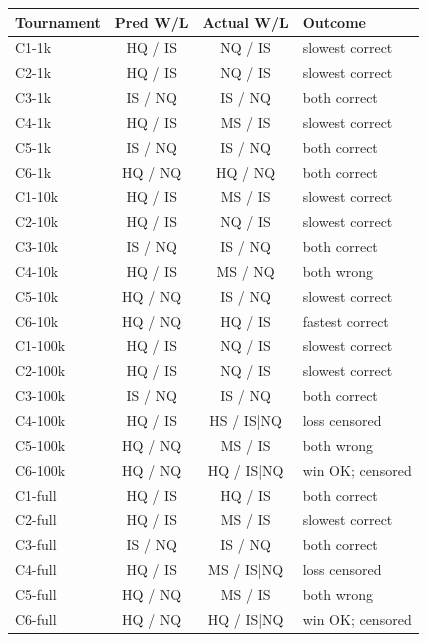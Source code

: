 \documentclass[10pt,a4paper]{article}
\begin{document}
\begin{minipage}[t]{0.485\linewidth}\vspace{0pt}
{\fontsize{8.6}{10.4}\selectfont
\renewcommand{\arraystretch}{1.28}
\begin{tabularx}{\linewidth}{@{}L{1.05}C{0.8}C{0.85}L{1.3}@{}}
\toprule{}
\textbf{Tournament} & \textbf{Pred W/L} & \textbf{Actual W/L} & \textbf{Outcome} \\
\midrule
C1-1k & HQ / IS & NQ / IS & slowest correct \\
C2-1k & HQ / IS & NQ / IS & slowest correct \\
C3-1k & IS / NQ & IS / NQ & both correct \\
C4-1k & HQ / IS & MS / IS & slowest correct \\
C5-1k & IS / NQ & IS / NQ & both correct \\
C6-1k & HQ / NQ & HQ / NQ & both correct \\
C1-10k & HQ / IS & MS / IS & slowest correct \\
C2-10k & HQ / IS & NQ / IS & slowest correct \\
C3-10k & IS / NQ & IS / NQ & both correct \\
C4-10k & HQ / IS & MS / NQ & both wrong \\
C5-10k & HQ / NQ & IS / NQ & slowest correct \\
C6-10k & HQ / NQ & HQ / IS & fastest correct \\
C1-100k & HQ / IS & NQ / IS & slowest correct \\
C2-100k & HQ / IS & NQ / IS & slowest correct \\
C3-100k & IS / NQ & IS / NQ & both correct \\
C4-100k & HQ / IS & HS / IS|NQ & loss censored \\
C5-100k & HQ / NQ & MS / IS & both wrong \\
C6-100k & HQ / NQ & HQ / IS|NQ & win OK; censored \\
C1-full & HQ / IS & HQ / IS & both correct \\
C2-full & HQ / IS & MS / IS & slowest correct \\
C3-full & IS / NQ & IS / NQ & both correct \\
C4-full & HQ / IS & MS / IS|NQ & loss censored \\
C5-full & HQ / NQ & MS / IS & both wrong \\
C6-full & HQ / NQ & HQ / IS|NQ & win OK; censored \\
\bottomrule
\end{tabularx}}
\end{minipage}
\end{document}
